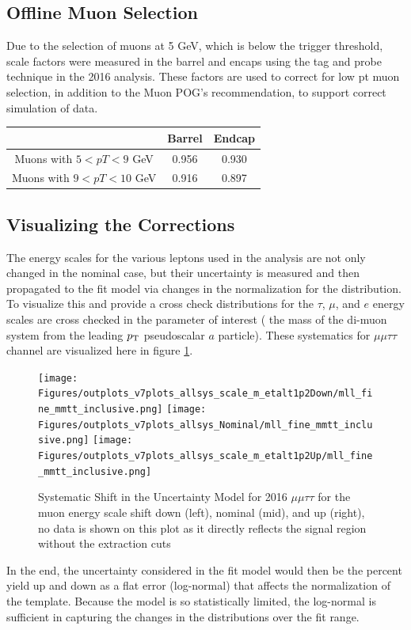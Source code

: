 \subsection{Offline Muon Selection}
Due to the selection of muons at 5 GeV, which is below the trigger threshold, scale factors were measured in the barrel and encaps using the tag and probe technique in the 2016 analysis. These factors are used to correct for low pt muon selection, in addition to the Muon POG's recommendation, to support correct simulation of data. 
\begin{table}[h!tbp]
\centering
{}
\begin{tabular*}{0.6\textwidth}{c|c|c}
   & Barrel & Endcap \\\hline
Muons with $5 < pT < 9$ GeV & 0.956 & 0.930\\\hline
Muons with $9 < pT < 10$ GeV & 0.916 & 0.897\\\hline 
\end{tabular*}
\end{table}


\subsection{Visualizing the Corrections}

The energy scales for the various leptons used in the analysis are not only changed in the nominal case, but their uncertainty is measured and then propagated to the fit model via changes in the normalization for the distribution. To visualize this and provide a cross check distributions for the $\tau$, $\mu$, and $e$ energy scales are cross checked in the parameter of interest ( the mass of the di-muon system from the leading $p_{\mathrm{T}}$ pseudoscalar $a$ particle). 
These systematics for $\mu\mu\tau\tau$ channel are visualized here in figure \ref{fig:sys_shift_mmtt2016}.
\begin{figure}[ht!b]
  \centering
\texttt{[image: Figures/outplots\_v7plots\_allsys\_scale\_m\_etalt1p2Down/mll\_fine\_mmtt\_inclusive.png]} 
\texttt{[image: Figures/outplots\_v7plots\_allsys\_Nominal/mll\_fine\_mmtt\_inclusive.png]}
\texttt{[image: Figures/outplots\_v7plots\_allsys\_scale\_m\_etalt1p2Up/mll\_fine\_mmtt\_inclusive.png]} \\

    \caption{\label{fig:sys_shift_mmtt2016} Systematic Shift in the Uncertainty Model for 2016 $\mu\mu\tau\tau$ for the muon energy scale shift down (left), nominal (mid), and up (right), no data is shown on this plot as it directly reflects the signal region without the extraction cuts }
\end{figure}

In the end, the uncertainty considered in the fit model would then be the percent yield up and down as a flat error (log-normal) that affects the normalization of the template. Because the model is so statistically limited, the log-normal is sufficient in capturing the changes in the distributions over the fit range.  
